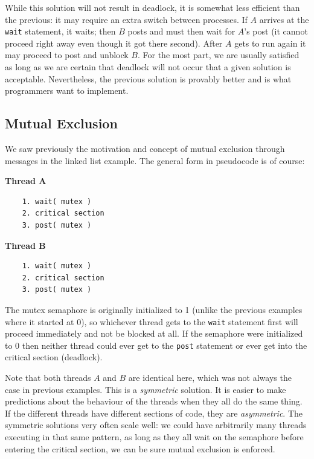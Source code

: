 While this solution will not result in deadlock, it is somewhat less efficient than the previous: it may require an extra switch between processes. If $A$ arrives at the \texttt{wait} statement, it waits; then $B$ posts and must then wait for $A$'s post (it cannot proceed right away even though it got there second). After $A$ gets to run again it may proceed to post and unblock $B$. For the most part, we are usually satisfied as long as we are certain that deadlock will not occur that a given solution is acceptable. Nevertheless, the previous solution is provably better and is what programmers want to implement.

\subsection*{Mutual Exclusion}
We saw previously the motivation and concept of mutual exclusion through messages in the linked list example. The general form in pseudocode is of course:

\begin{multicols}{2}
\textbf{Thread A}\vspace{-2em}
  \begin{verbatim}
	1. wait( mutex )
	2. critical section
	3. post( mutex )
  \end{verbatim}
\columnbreak
\textbf{Thread B}\vspace{-2em}
  \begin{verbatim}
	1. wait( mutex )
	2. critical section
	3. post( mutex )
  \end{verbatim}
\end{multicols}
\vspace{-2em}

The mutex semaphore is originally initialized to 1 (unlike the previous examples where it started at 0), so whichever thread gets to the \texttt{wait} statement first will proceed immediately and not be blocked at all. If the semaphore were initialized to 0 then neither thread could ever get to the \texttt{post} statement or ever get into the critical section (deadlock).

Note that both threads $A$ and $B$ are identical here, which was not always the case in previous examples. This is a \textit{symmetric} solution. It is easier to make predictions about the behaviour of the threads when they all do the same thing. If the different threads have different sections of code, they are \textit{asymmetric}. The symmetric solutions very often scale well: we could have arbitrarily many threads executing in that same pattern, as long as they all wait on the semaphore before entering the critical section, we can be sure mutual exclusion is enforced.

